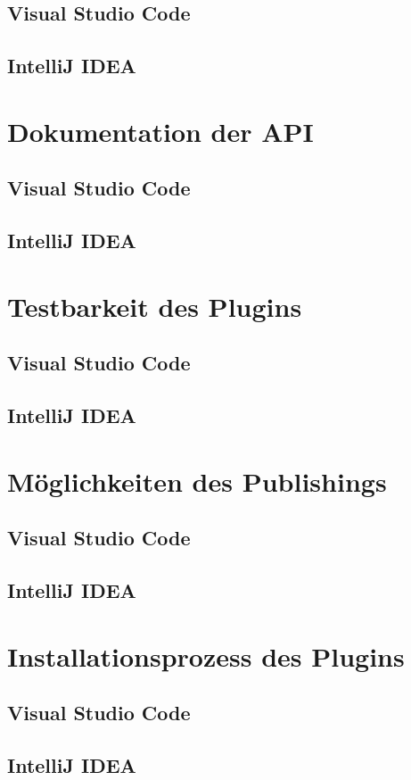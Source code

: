 \subsection{Visual Studio Code}

\subsection{IntelliJ IDEA}


\section{Dokumentation der API}
\label{sec:Kriterien_Dokumentation}

\subsection{Visual Studio Code}

\subsection{IntelliJ IDEA}


\section{Testbarkeit des Plugins}
\label{sec:Kriterien_Testbarkeit}

\subsection{Visual Studio Code}

\subsection{IntelliJ IDEA}


\section{Möglichkeiten des Publishings}
\label{sec:Kriterien_Publishing}

\subsection{Visual Studio Code}

\subsection{IntelliJ IDEA}


\section{Installationsprozess des Plugins}
\label{sec:Kriterien_Installationsprozess}

\subsection{Visual Studio Code}

\subsection{IntelliJ IDEA}

